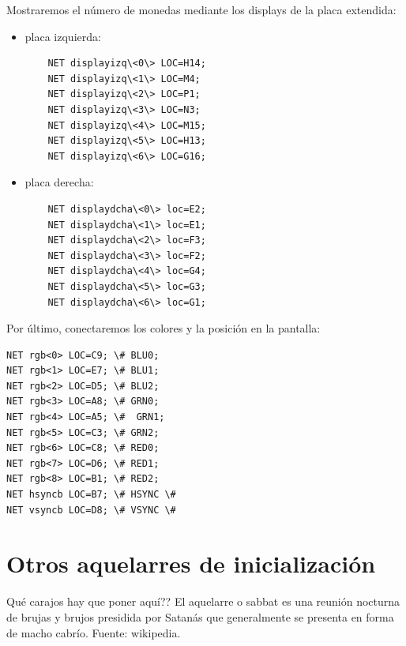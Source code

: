 \documentclass[11pt, a4paper, spanish, openright, twoside]{book}
\begin{document}
Mostraremos el número de monedas mediante los displays de la placa extendida:

\begin{itemize}
	\item placa izquierda:
	\begin{lstlisting}
	NET displayizq\<0\> LOC=H14;
	NET displayizq\<1\> LOC=M4;
	NET displayizq\<2\> LOC=P1;
	NET displayizq\<3\> LOC=N3;
	NET displayizq\<4\> LOC=M15;
	NET displayizq\<5\> LOC=H13;
	NET displayizq\<6\> LOC=G16;
	\end{lstlisting}

	\item placa derecha:
	\begin{lstlisting}
	NET displaydcha\<0\> loc=E2;
	NET displaydcha\<1\> loc=E1;
	NET displaydcha\<2\> loc=F3;
	NET displaydcha\<3\> loc=F2;
	NET displaydcha\<4\> loc=G4;
	NET displaydcha\<5\> loc=G3;
	NET displaydcha\<6\> loc=G1;
	\end{lstlisting}
\end{itemize}

Por último, conectaremos los colores y la posición en la pantalla:

\begin{lstlisting}
NET rgb<0> LOC=C9; \# BLU0;
NET rgb<1> LOC=E7; \# BLU1;
NET rgb<2> LOC=D5; \# BLU2;
NET rgb<3> LOC=A8; \# GRN0; 
NET rgb<4> LOC=A5; \#  GRN1;
NET rgb<5> LOC=C3; \# GRN2;
NET rgb<6> LOC=C8; \# RED0;
NET rgb<7> LOC=D6; \# RED1;
NET rgb<8> LOC=B1; \# RED2;
NET hsyncb LOC=B7; \# HSYNC \# 
NET vsyncb LOC=D8; \# VSYNC \# 
\end{lstlisting}








\section{Otros aquelarres de inicialización}
Qué carajos hay que poner aquí??
El aquelarre o sabbat es una reunión nocturna de brujas y brujos presidida por Satanás que generalmente se presenta en forma de macho cabrío. Fuente: wikipedia.
\end{document}
